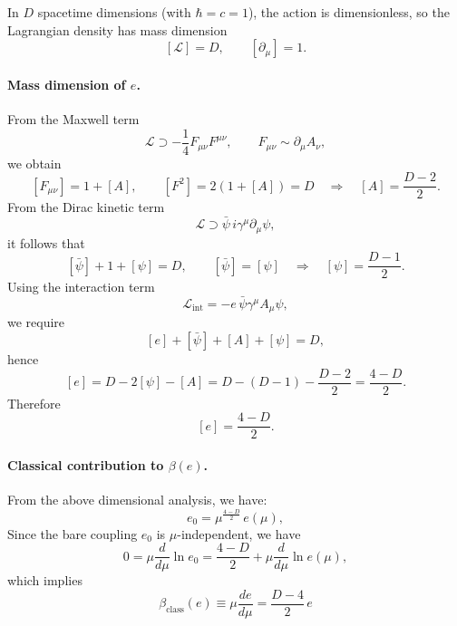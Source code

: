 \begin{solution}[22.7]
	In $D$ spacetime dimensions (with $\hbar=c=1$), the action is dimensionless, so the Lagrangian density has mass dimension
	\[
	[\mathcal L]=D,\qquad [\partial_\mu]=1.
	\]
	
	\paragraph{Mass dimension of $e$.}
	From the Maxwell term
	\[
	\mathcal L \supset -\frac14 F_{\mu\nu}F^{\mu\nu},\qquad F_{\mu\nu}\sim \partial_\mu A_\nu,
	\]
	we obtain
	\[
	[F_{\mu\nu}]=1+[A],\qquad [F^2]=2(1+[A])=D
	\quad\Rightarrow\quad
	[A]=\frac{D-2}{2}.
	\]
	From the Dirac kinetic term
	\[
	\mathcal L \supset \bar\psi\, i\gamma^\mu\partial_\mu \psi,
	\]
	it follows that
	\[
	[\bar\psi]+1+[\psi]=D,\qquad [\bar\psi]=[\psi]
	\quad\Rightarrow\quad
	[\psi]=\frac{D-1}{2}.
	\]
	Using the interaction term
	\[
	\mathcal L_{\text{int}}=-e\,\bar\psi\gamma^\mu A_\mu\psi,
	\]
	we require
	\[
	[e]+[\bar\psi]+[A]+[\psi]=D,
	\]
	hence
	\[
	[e]=D-2[\psi]-[A]
	= D-(D-1)-\frac{D-2}{2}
	=\frac{4-D}{2}.
	\]
	Therefore
	\[
	\boxed{
	[e]=\frac{4-D}{2}.
}
	\]
	
	\paragraph{Classical contribution to $\beta(e)$.}
	From the above dimensional analysis, we have:
	\[
	e_0=\mu^{\frac{4-D}{2}}\,e(\mu),
	\]
	Since the bare coupling $e_0$ is $\mu$-independent, we have
	\[
	0=\mu\frac{d}{d\mu}\ln e_0
	=\frac{4-D}{2}+\mu\frac{d}{d\mu}\ln e(\mu),
	\]
	which implies
	\[
	\boxed{
	\beta_{\text{class}}(e)\equiv \mu\frac{de}{d\mu}
	=\frac{D-4}{2}\,e}
	\]
\end{solution}
